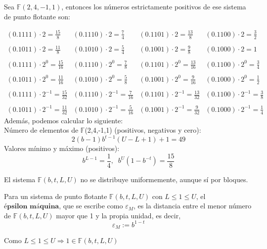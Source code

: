 \begin{ejemplo}
Sea $\mathbb{F} (2,4,-1,1)$, entonces los números estrictamente positivos de ese sistema de punto flotante son:

\[ \begin{array}{llll}
(0.1111) \cdot 2 = \frac{15}{8} & (0.1110) \cdot 2 = \frac{7}{4} & (0.1101) \cdot 2 = \frac{13}{8} & (0.1100) \cdot 2 = \frac{3}{2} \\
\\ (0.1011) \cdot 2 = \frac{11}{8} & (0.1010) \cdot 2 = \frac{5}{4} & (0.1001) \cdot 2 = \frac{9}{8} & (0.1000) \cdot 2 = 1 \\
\\ (0.1111) \cdot 2^0 = \frac{15}{16} & (0.1110) \cdot 2^0 = \frac{7}{8} & (0.1101) \cdot 2^0 = \frac{13}{16} & (0.1100) \cdot 2^0 = \frac{3}{4}\\
\\ (0.1011) \cdot 2^0 = \frac{11}{16} & (0.1010) \cdot 2^0 = \frac{5}{8} & (0.1001) \cdot 2^0 = \frac{9}{16} & (0.1000) \cdot 2^0 = \frac{1}{2}\\
\\ (0.1111) \cdot 2^{-1} = \frac{15}{32} & (0.1110) \cdot 2^{-1} = \frac{7}{16} & (0.1101) \cdot 2^{-1} = \frac{13}{32} & (0.1100) \cdot 2^{-1} = \frac{3}{8}\\
\\ (0.1011) \cdot 2^{-1} = \frac{11}{32} & (0.1010) \cdot 2^{-1} = \frac{5}{16} & (0.1001) \cdot 2^{-1} = \frac{9}{32} & (0.1000) \cdot 2^{-1} = \frac{1}{4}
\end{array} \]
Además, podemos calcular lo siguiente:\\
Número de elementos de $\mathbb{F}$(2,4,-1,1) (positivos, negativos y cero):
\[ 2(b-1)b^{t-1}(U-L+1) + 1 = 49 \]
Valores mínimo y máximo (positivos):
\[ b^{L-1} = \frac{1}{4}, \; \; b^U(1-b^{-t}) = \frac{15}{8} \]
\end{ejemplo}

El sistema $\mathbb{F} (b,t,L,U)$ no se distribuye uniformemente, aunque sí por bloques.

\begin{ndef}
Para un sistema de punto flotante $\mathbb{F} (b,t,L,U)$ con $L \leq 1 \leq U$, el $\textbf{épsilon máquina}$, que se escribe como $\varepsilon _M$, es la distancia entre el menor número de $\mathbb{F} (b,t,L,U)$ mayor que 1 y la propia unidad, es decir,
\[ \varepsilon _M := b^{1-t} \]
\end{ndef}

Como $L \leq 1 \leq U \Rightarrow 1 \in \mathbb{F} (b,t,L,U)$ 

